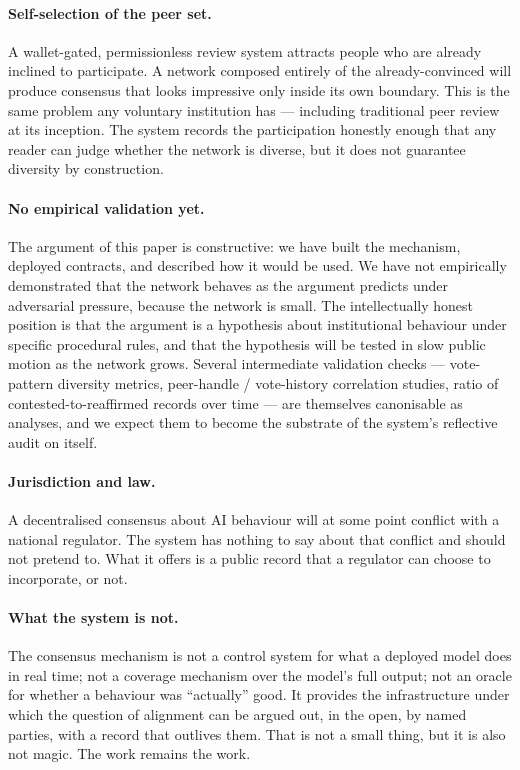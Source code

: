 \documentclass[11pt,a4paper]{article}
\begin{document}
\paragraph{Self-selection of the peer set.} A wallet-gated,
permissionless review system attracts people who are already
inclined to participate. A network composed entirely of the
already-convinced will produce consensus that looks impressive
only inside its own boundary. This is the same problem any
voluntary institution has --- including traditional peer review
at its inception. The system records the participation honestly
enough that any reader can judge whether the network is
diverse, but it does not guarantee diversity by construction.

\paragraph{No empirical validation yet.} The argument of this
paper is constructive: we have built the mechanism, deployed
contracts, and described how it would be used. We have not
empirically demonstrated that the network behaves as the
argument predicts under adversarial pressure, because the
network is small. The intellectually honest position is that
the argument is a hypothesis about institutional behaviour
under specific procedural rules, and that the hypothesis will
be tested in slow public motion as the network grows. Several
intermediate validation checks --- vote-pattern diversity
metrics, peer-handle / vote-history correlation studies, ratio
of contested-to-reaffirmed records over time --- are themselves
canonisable as analyses, and we expect them to become the
substrate of the system's reflective audit on itself.

\paragraph{Jurisdiction and law.} A decentralised consensus
about AI behaviour will at some point conflict with a national
regulator. The system has nothing to say about that conflict
and should not pretend to. What it offers is a public record
that a regulator can choose to incorporate, or not.

\paragraph{What the system is not.} The consensus mechanism is
not a control system for what a deployed model does in real
time; not a coverage mechanism over the model's full output;
not an oracle for whether a behaviour was ``actually'' good. It
provides the infrastructure under which the question of
alignment can be argued out, in the open, by named parties,
with a record that outlives them. That is not a small thing,
but it is also not magic. The work remains the work.
\end{document}
